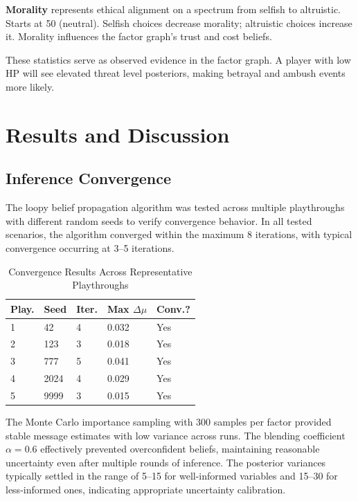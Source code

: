 \documentclass[journal]{IEEEtran}
\begin{document}
\textbf{Morality} represents ethical alignment on a spectrum from selfish to altruistic. Starts at 50 (neutral). Selfish choices decrease morality; altruistic choices increase it. Morality influences the factor graph's trust and cost beliefs.

These statistics serve as observed evidence in the factor graph. A player with low HP will see elevated threat level posteriors, making betrayal and ambush events more likely.


\section{Results and Discussion}

\subsection{Inference Convergence}

The loopy belief propagation algorithm was tested across multiple playthroughs with different random seeds to verify convergence behavior. In all tested scenarios, the algorithm converged within the maximum 8 iterations, with typical convergence occurring at 3--5 iterations.

\begin{table}[!ht]
\centering
\caption{Convergence Results Across Representative Playthroughs}
\label{tab:convergence}
\small
\setlength{\tabcolsep}{3pt}
\begin{tabular}{|l|l|l|l|l|}
\hline
\textbf{Play.} & \textbf{Seed} & \textbf{Iter.} & \textbf{Max $\Delta\mu$} & \textbf{Conv.?} \\
\hline
1 & 42 & 4 & 0.032 & Yes \\
\hline
2 & 123 & 3 & 0.018 & Yes \\
\hline
3 & 777 & 5 & 0.041 & Yes \\
\hline
4 & 2024 & 4 & 0.029 & Yes \\
\hline
5 & 9999 & 3 & 0.015 & Yes \\
\hline
\end{tabular}
\vspace{-6pt}
\end{table}

The Monte Carlo importance sampling with 300 samples per factor provided stable message estimates with low variance across runs. The blending coefficient $\alpha = 0.6$ effectively prevented overconfident beliefs, maintaining reasonable uncertainty even after multiple rounds of inference. The posterior variances typically settled in the range of 5--15 for well-informed variables and 15--30 for less-informed ones, indicating appropriate uncertainty calibration.
\end{document}
